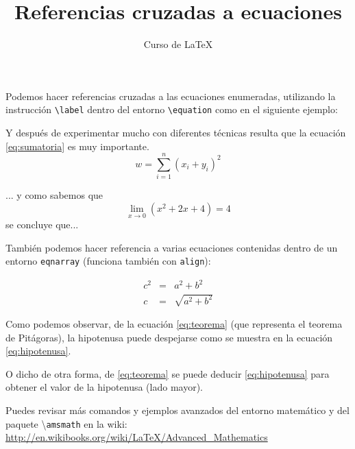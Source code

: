 \documentclass[10pt,letterpaper]{article}
\title{Referencias cruzadas a ecuaciones}
\author{Curso de \LaTeX}
\begin{document}
\maketitle

Podemos hacer referencias cruzadas a las ecuaciones enumeradas, utilizando la instrucción \texttt{\textbackslash label} dentro del entorno \texttt{\textbackslash equation} como en el siguiente ejemplo:

Y después de experimentar mucho con diferentes técnicas resulta que la ecuación \ref{eq:sumatoria} es muy importante.
\begin{equation} \label{eq:sumatoria}
  w = \sum_{i=1}^{n} {(x_{i}+y_{i})^{2}}   
\end{equation}

... y como sabemos que
\begin{equation*} %
  \lim_{x \to 0} {(x^{2} + 2x + 4)} = 4
\end{equation*}
se concluye que...

\vspace{0.5cm}

También podemos hacer referencia a varias ecuaciones contenidas dentro de un entorno \texttt{eqnarray} (funciona también con \texttt{align}):

\begin{eqnarray}
	c^2&=&a^2 + b^2\label{eq:teorema}\\
	c &=&\sqrt{a^2 + b^2}\label{eq:hipotenusa}
\end{eqnarray}

Como podemos observar, de la ecuación \ref{eq:teorema} (que representa el teorema de Pitágoras),  la hipotenusa puede despejarse como se muestra en la ecuación \ref{eq:hipotenusa}.

O dicho de otra forma, de \eqref{eq:teorema} se puede deducir \eqref{eq:hipotenusa}  para obtener el valor de la hipotenusa (lado mayor). %

Puedes revisar más comandos y ejemplos avanzados del entorno matemático y del paquete \textbackslash\texttt{amsmath} en la wiki: \url{http://en.wikibooks.org/wiki/LaTeX/Advanced_Mathematics}
\end{document}
